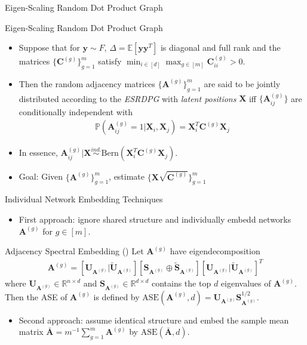 \documentclass[handout]{beamer}
\newcommand{\bvar}[1]{\mathbf{#1}}
\begin{document}
\begin{frame}{Eigen-Scaling Random Dot Product Graph}
    \begin{block}{Eigen-Scaling Random Dot Product Graph}
    \begin{itemize}
    \item Suppose that for $\bvar{y}\sim F$, $\Delta = \mathbb{E}[\bvar{yy}^T]$ is diagonal and full rank and the matrices $\{\bvar{C}^{(g)}\}_{g=1}^m$ satisfy $\min_{i\in[d]}\max_{g\in[m]}\bvar{C}^{(g)}_{ii} > 0$.\pause
    \item Then the random adjacency matrices $\{\bvar{A}^{(g)}\}_{g=1}^m $ are said to be jointly distributed according to the \textit{ESRDPG} with \textit{latent positions} $\bvar{X}$ iff $\{\bvar{A}_{ij}^{(g)}\}$ are conditionally independent with 
    \begin{align*}
        \mathbb{P}(\bvar{A}_{ij}^{(g)} = 1|\bvar{X}_i, \bvar{X}_j) = \bvar{X}_i^T\bvar{C}^{(g)}\bvar{X}_j
    \end{align*}
    \end{itemize}
    \end{block}\pause
    \begin{itemize}
        \item In essence, $\bvar{A}_{ij}^{(g)}|\bvar{X}\overset{ind.}{\sim} \text{Bern}(\bvar{X}_i^T\bvar{C}^{(g)}\bvar{X}_j)$. \pause
        \item Goal: Given $\{\bvar{A}^{(g)}\}_{g=1}^m$, estimate $\{\bvar{X}\sqrt{\bvar{C}^{(g)}}\}_{g=1}^m$
    \end{itemize}
\end{frame}


\begin{frame}{Individual Network Embedding Techniques}
\begin{itemize}
    \item First approach: ignore shared structure and individually embedd networks $\bvar{A}^{(g)}$ for $g\in[m]$.\pause
\end{itemize}
    \begin{block}{Adjacency Spectral Embedding (\cite{ASE})}
        Let $\bvar{A}^{(g)}$ have eigendecomposition 
        \begin{align*}
            \bvar{A}^{(g)} = [\bvar{U}_{\bvar{A}^{(g)}}|\tilde{\bvar{U}}_{\bvar{A}^{(g)}}][\bvar{S}_{\bvar{A}^{(g)}}\oplus \tilde{\bvar{S}}_{\bvar{A}^{(g)}}][\bvar{U}_{\bvar{A}^{(g)}}|\tilde{\bvar{U}}_{\bvar{A}^{(g)}}]^T
        \end{align*}
        where $\bvar{U}_{\bvar{A}^{(g)}}\in\mathbb{R}^{n\times d}$ and $\bvar{S}_{\bvar{A}^{(g)}}\in\mathbb{R}^{d\times d}$ contains the top $d$ eigenvalues of $\bvar{A}^{(g)}$. Then the ASE of $\bvar{A}^{(g)}$ is defined by $\text{ASE}(\bvar{A}^{(g)},d) = \bvar{U}_{\bvar{A}^{(g)}}\bvar{S}_{\bvar{A}^{(g)}}^{1/2}$.
        \end{block}
    \begin{itemize}
    \item Second approach: assume identical structure and embed the sample mean matrix $\bar{\bvar{A}} =  m^{-1}\sum_{g=1}^m \bvar{A}^{(g)}$ by $\text{ASE}(\bar{\bvar{A}}, d)$. 
\end{itemize}
\end{frame}
\end{document}
